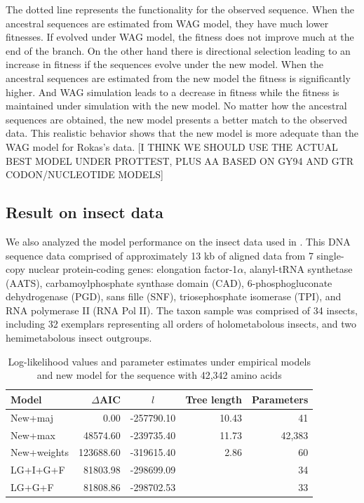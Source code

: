 The dotted line represents the functionality for the observed sequence.
When the ancestral sequences are estimated from WAG model, they have much lower fitnesses. 
If evolved under WAG model, the fitness does not improve much at the end of the branch.
On the other hand there is directional selection leading to an increase in fitness if the sequences evolve under the new model. 
When the ancestral sequences are estimated from the new model the fitness is significantly higher. 
And WAG simulation leads to a decrease in fitness while the fitness is maintained under simulation with the new model.
No matter how the ancestral sequences are obtained, the new model presents a better match to the observed data.
This realistic behavior shows that the new model is more adequate than the WAG model for Rokas's data. [I THINK WE SHOULD USE THE ACTUAL BEST MODEL UNDER PROTTEST, PLUS  AA BASED ON GY94 AND GTR CODON/NUCLEOTIDE MODELS]

\subsection{Result on insect data}
We also analyzed the model performance on the insect data used in \cite{McKenna2010}. This DNA sequence data comprised of approximately 13 kb of aligned data from 7 single-copy nuclear protein-coding genes: elongation factor-1$\alpha$, alanyl-tRNA synthetase (AATS), carbamoylphosphate synthase domain (CAD), 6-phosphogluconate dehydrogenase (PGD), sans fille (SNF), triosephosphate isomerase (TPI), and RNA polymerase II (RNA Pol II). The taxon sample was comprised of 34 insects, including 32 exemplars representing all orders of holometabolous insects, and two hemimetabolous insect outgroups.

\begin{table}[h]
\begin{center}
\begin{tabular}{l r c r r}
\hline
Model & $\Delta$AIC & $l$ & Tree length & Parameters \\
\hline
New+maj & 0.00 & -257790.10 &  10.43 & 41 \\
New+max & 48574.60 & -239735.40 & 11.73 & 42,383 \\
New+weights & 123688.60 & -319615.40 & 2.86 & 60 \\
LG+I+G+F & 81803.98 & -298699.09 &  & 34\\
LG+G+F & 81808.86 & -298702.53 & & 33 \\
\hline
\end{tabular}
\end{center}
\caption{Log-likelihood values and parameter estimates under empirical models and new model for the sequence with 42,342 amino acids}
\label{table:mle}
\end{table}